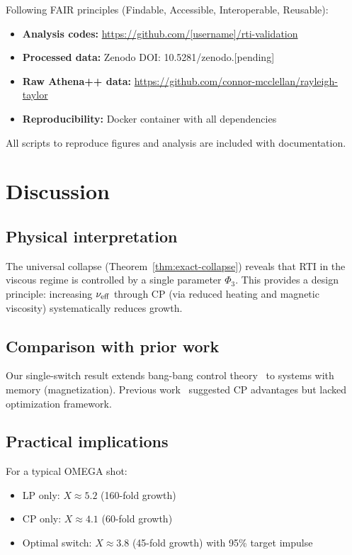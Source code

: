 \documentclass[aps,pre,twocolumn,showpacs,superscriptaddress]{revtex4-2}
\theoremstyle{definition}
\begin{document}
Following FAIR principles (Findable, Accessible, Interoperable, Reusable):

\begin{itemize}
\item \textbf{Analysis codes:} \url{https://github.com/[username]/rti-validation}
\item \textbf{Processed data:} Zenodo DOI: 10.5281/zenodo.[pending]
\item \textbf{Raw Athena++ data:} \url{https://github.com/connor-mcclellan/rayleigh-taylor}
\item \textbf{Reproducibility:} Docker container with all dependencies
\end{itemize}

All scripts to reproduce figures and analysis are included with documentation.

\section{Discussion}\label{sec:discussion}

\subsection{Physical interpretation}

The universal collapse (Theorem~\ref{thm:exact-collapse}) reveals that RTI in the viscous regime is controlled by a single parameter $\Phi_3$. This provides a design principle: increasing $\nu_{\rm eff}$ through CP (via reduced heating and magnetic viscosity) systematically reduces growth.

\subsection{Comparison with prior work}

Our single-switch result extends bang-bang control theory~\cite{Pontryagin1962} to systems with memory (magnetization). Previous work~\cite{Robinson2009PPCF} suggested CP advantages but lacked optimization framework.

\subsection{Practical implications}

For a typical OMEGA shot:
\begin{itemize}
\item LP only: $X \approx 5.2$ (160-fold growth)
\item CP only: $X \approx 4.1$ (60-fold growth)
\item Optimal switch: $X \approx 3.8$ (45-fold growth) with 95\% target impulse
\end{itemize}
\end{document}
